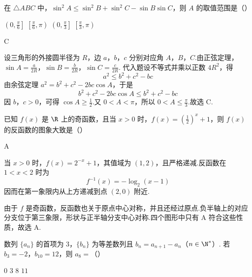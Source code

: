 \begin{problem}
在 \(\triangle ABC\) 中，\(\sin^2 A \leqslant \sin^2 B + \sin^2 C - \sin B \sin C\)，则 \(A\) 的取值范围是（\quad）

\choices
    {\(\left(0, \frac{\pi}{6}\right]\)}
    {\(\left[\frac{\pi}{6},\pi\right)\)}
    {\(\left(0, \frac{\pi}{3}\right]\)}
    {\(\left[\frac{\pi}{3}, \pi\right)\)}
\end{problem}

\begin{answer}
C
\end{answer}

\begin{solution}
设三角形的外接圆半径为 \(R\)，边 \(a\)，\(b\)，\(c\) 分别对应角 \(A\)，\(B\)，\(C\).由正弦定理，
\(\sin A=\frac{a}{2R}\)，\(\sin B=\frac{b}{2R}\)，\(\sin C=\frac{c}{2R}\).
代入题设不等式并乘以正数 \(4R^2\)，得
\[
a^2\leqslant b^2+c^2-bc
\]
由余弦定理 \(a^2=b^2+c^2-2bc\cos A\)，于是
\[
b^2+c^2-2bc\cos A\leqslant b^2+c^2-bc
\]
因 \(b\)，\(c>0\)，可得 \(\cos A\geqslant\frac12\).又 \(0<A<\pi\)，所以 \(0<A\leqslant\frac{\pi}{3}\).故选 C.
\end{solution}

\begin{problem}
已知 \( f(x) \) 是 \( \R \) 上的奇函数，且当 \( x > 0 \) 时，\( f(x) = \left(\frac{1}{2}\right)^x + 1 \)，则 \( f(x) \) 的反函数的图象大致是（\quad）

    {}
    {}
    {}
\end{problem}

\begin{answer}
A
\end{answer}

\begin{solution}
当 \(x>0\) 时，\(f(x)=2^{-x}+1\)，其值域为 \((1,2)\)，且严格递减.反函数在 \(1<x<2\) 时为
\[
f^{-1}(x)=-\log_{2}(x-1)
\]
因而在第一象限内从上方递减到点 \((2,0)\) 附近.

由于 \(f\) 是奇函数，反函数也关于原点中心对称，并且还经过原点.负半轴上的对应分支位于第三象限，形状与正半轴分支中心对称.四个图形中只有 A 符合这些性质，故选 A.
\end{solution}

\begin{problem}
数列 \( \{a_{n}\} \) 的首项为 3，\( \{b_{n}\} \) 为等差数列且 \( b_{n}=a_{n+1}-a_{n} \)（\( n\in \N^{*} \)）. 若 \( b_{3}=-2 \)，\( b_{10}=12 \)，则 \( a_{8} =\)（\quad）

\choices
    {\(0\)}
    {\(3\)}
    {\(8\)}
    {\(11\)}
\end{problem}

